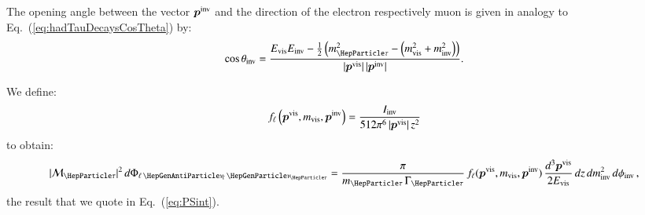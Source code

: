 The opening angle between the vector $\bm{p}^{\textrm{inv}}$ and the direction
of the electron respectively muon is given in analogy to Eq.~(\ref{eq:hadTauDecaysCosTheta}) by:
\begin{equation}
\cos\theta_{\inv} = \frac{E_{\vis} E_{\inv} - \frac{1}{2} \left(m^{2}_{\Pgt} - \left( m^{2}_{\vis} + m^{2}_{\inv} \right) \right)}{\vert\bm{p}^{\vis}\vert \, 
  \vert\bm{p}^{\inv}\vert}.
\label{eq:lepTauDecaysCosTheta}
\end{equation}

We define:
\begin{equation}
f_{\ell}\left(\bm{p}^{\textrm{vis}}, m_{\textrm{vis}}, \bm{p}^{\textrm{inv}}\right) = 
\frac{I_{\textrm{inv}}}{512\pi^{6} \, \vert\bm{p}^{\textrm{vis}}\vert \, z^{2}}
\label{eq:lepTauDecays_f}
\end{equation}
to obtain:
\begin{equation}
\vert\mathcal{M}_{\Pgt}\vert^{2} \,
 d\Phi_{\ellnunu} = \frac{\pi}{m_{\Pgt} \, \Gamma_{\Pgt}} \,
 f_{\Plepton}(\bm{p}^{\vis}, m_{\vis}, \bm{p}^{\inv}) \, \frac{d^{3}\bm{p}^{\vis}}{2 E_{\vis}} \, dz \, dm^{2}_{\inv} \, d\phi_{\inv}
 \, ,
\end{equation}
the result that we quote in Eq.~(\ref{eq:PSint}).